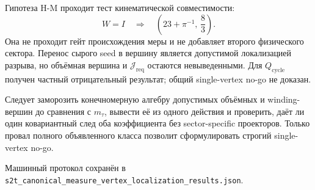 \begin{proposition}
Гипотеза H-M проходит тест кинематической совместимости:
\begin{equation}
 W=I
 \quad\Longrightarrow\quad
 \left(23+\pi^{-1},\,\frac83\right).
\end{equation}
Она не проходит гейт происхождения меры и не добавляет второго физического
сектора. Перенос сырого seed в вершину является допустимой локализацией
разрыва, но объёмная вершина и \(\mathcal J_{\mathrm{req}}\) остаются
невыведенными. Для \(Q_{\mathrm{cycle}}\) получен частный отрицательный
результат; общий single-vertex no-go не доказан.
\end{proposition}

\begin{protocol}
Следует заморозить конечномерную алгебру допустимых объёмных и winding-вершин
до сравнения с \(m_\tau\), вывести её из одного действия и проверить, даёт ли
один ковариантный след оба коэффициента без sector-specific проекторов.
Только провал полного объявленного класса позволит сформулировать строгий
single-vertex no-go.
\end{protocol}

Машинный протокол сохранён в
\texttt{s2t\_canonical\_measure\_vertex\_localization\_results.json}.